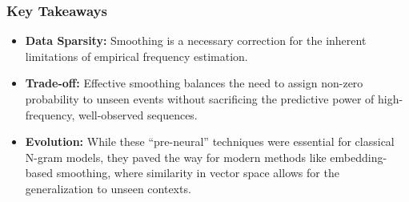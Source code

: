 \documentclass[
  italian,
  11pt,
]{article}
\providecommand{\tightlist}{%
  \setlength{\itemsep}{0pt}\setlength{\parskip}{0pt}}
\begin{document}
\subsubsection{Key Takeaways}\label{key-takeaways-9}

\begin{itemize}
\tightlist
\item
  \textbf{Data Sparsity:} Smoothing is a necessary correction for the
  inherent limitations of empirical frequency estimation.
\item
  \textbf{Trade-off:} Effective smoothing balances the need to assign
  non-zero probability to unseen events without sacrificing the
  predictive power of high-frequency, well-observed sequences.
\item
  \textbf{Evolution:} While these ``pre-neural'' techniques were
  essential for classical N-gram models, they paved the way for modern
  methods like embedding-based smoothing, where similarity in vector
  space allows for the generalization to unseen contexts.
\end{itemize}
\end{document}
